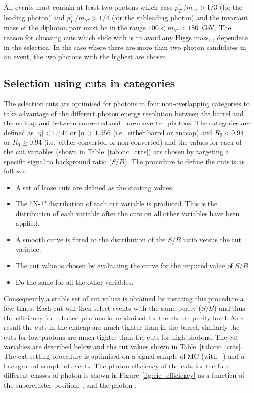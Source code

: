 All events must contain at least two photons which pass $p_{T}^{\gamma_{1}}/m_{\gamma\gamma}>1/3$ (for the leading photon) and $p_{T}^{\gamma_{2}}/m_{\gamma\gamma}>1/4$ (for the subleading photon) and the invariant mass of the diphoton pair must be in the range $100<m_{\gamma\gamma}<180$~GeV. The reason for choosing \pT cuts which slide with \mgg is to avoid any Higgs mass, \mH, dependece in the selection. In the case where there are more than two photon candidates in an event, the two photons with the highest \pT are chosen. 

\subsection{Selection using cuts in categories}
\label{sec:cic}

The selection cuts are optimised for photons in four non-overlapping categories to take advantage of the different photon energy resolution between the barrel and the endcap and between converted and non-converted photons. The categories are defined as $|\eta|<1.444$ or $|\eta|>1.556$ (i.e.\ either barrel or endcap) and $R_{9}<0.94$ or $R_{9}\geq 0.94$ (i.e.\ either converted or non-converted) and the values for each of the cut variables (shown in Table~\ref{tab:cic_cuts}) are chosen by targeting a specific signal to background ratio ($S/B$). The procedure to define the cuts is as follows:

\begin{itemize}
  \item A set of loose cuts are defined as the starting values.
  \item The ``N-1" distribution of each cut variable is produced. This is the distribution of each variable after the cuts on all other variables have been applied.
  \item A smooth curve is fitted to the distribution of the $S/B$ ratio versus the cut variable.
  \item The cut value is chosen by evaluating the curve for the required value of $S/B$.
  \item Do the same for all the other variables.
\end{itemize}

Consequently a stable set of cut values is obtained by iterating this procedure a few times. Each cut will then select events with the same purity ($S/B$) and thus the efficiency for selected photons is maximised for the chosen purity level. As a result the cuts in the endcap are much tighter than in the barrel, similarly the cuts for low \rnine photons are much tighter than the cuts for high \rnine photons. The cut variables are described below and the cut values shown in Table~\ref{tab:cic_cuts}. The cut setting procedure is optimised on a signal sample of \Hgg MC (with ~\GeV) and a background sample of \gjet events. The photon efficiency of the cuts for the four different classes of photon is shown in Figure~\ref{fig:cic_efficiency} as a function of the supercluster position, \eta, and the photon \pT.

